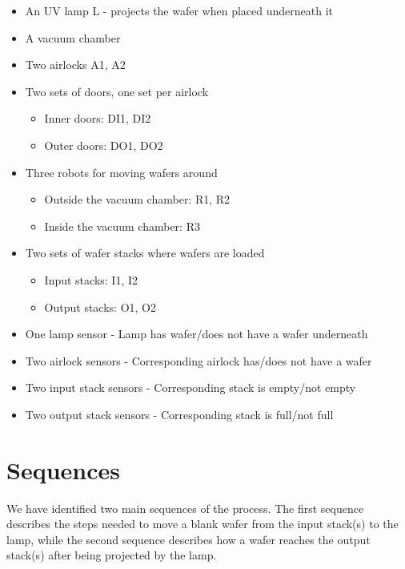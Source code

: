 \begin{itemize}
	\item An UV lamp L - projects the wafer when placed underneath it
	\item A vacuum chamber
	\item Two airlocks A1, A2
	
	\item Two sets of doors, one set per airlock
	\begin{itemize}
		\item Inner doors: DI1, DI2
		\item Outer doors: DO1, DO2
	\end{itemize}
	
	\item Three robots for moving wafers around
	\begin{itemize}
		\item Outside the vacuum chamber: R1, R2
		\item Inside the vacuum chamber: R3
	\end{itemize}
	
	\item Two sets of wafer stacks where wafers are loaded
	\begin{itemize}
		\item Input stacks: I1, I2
		\item Output stacks: O1, O2
	\end{itemize}
	
	\item One lamp sensor - Lamp has wafer/does not have a wafer underneath
	\item Two airlock sensors - Corresponding airlock has/does not have a wafer
	\item Two input stack sensors - Corresponding stack is empty/not empty
	\item Two output stack sensors - Corresponding stack is full/not full
	
\end{itemize}

\section{Sequences}

We have identified two main sequences of the process. The first sequence describes the steps needed to move a blank wafer from the input stack(s) to the lamp, while the second sequence describes how a wafer reaches the output stack(s) after being projected by the lamp.

